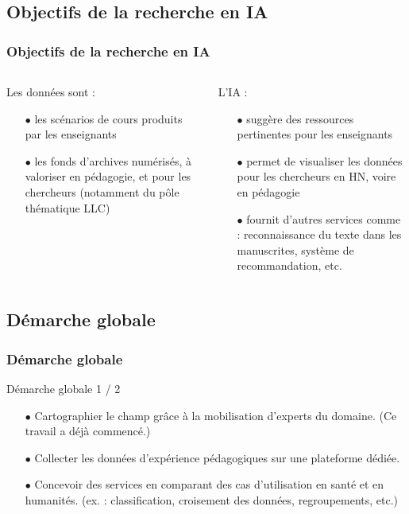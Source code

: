 \documentclass[xcolor=dvipsnames]{beamer}
\begin{document}
\subsection{Objectifs de la recherche en IA
}
\begin{frame}[fragile]
\frametitle{Objectifs de la recherche en IA
}
\begin{columns}
	\begin{block}{Les données sont :}
		\begin{itemize}
			\item[$\bullet$]les scénarios de cours produits par les enseignants
			\item[$\bullet$]les fonds d’archives numérisés, à valoriser en pédagogie, et pour les chercheurs (notamment du pôle thématique LLC)
		\end{itemize}	
	\end{block}
\vspace{4cm}
	\begin{block}{L'IA :}
		\begin{itemize}
		\item[$\bullet$]suggère des ressources pertinentes pour les enseignants
		\item[$\bullet$]permet de visualiser les données pour les chercheurs en HN, voire en pédagogie
		\item[$\bullet$]fournit d’autres services comme : reconnaissance du texte dans les manuscrites, système de recommandation, etc.
		\end{itemize}
	\end{block}
\vspace{2.5cm}
\end{columns}
\end{frame}

\subsection{Démarche globale}
\begin{frame}[fragile]
\frametitle{Démarche globale}
\begin{block}{Démarche globale 1 / 2}
	\begin{itemize}
		\item[$\bullet$]Cartographier le champ grâce à la mobilisation d’experts du domaine. (Ce travail a déjà commencé.)
		\item[$\bullet$]Collecter les données d’expérience pédagogiques sur une plateforme dédiée.
		\item[$\bullet$]Concevoir des services en comparant des cas d'utilisation en santé et en humanités. (ex. : classification, croisement des données, regroupements, etc.)
	\end{itemize}
\end{block}
\vspace{2cm}
\end{frame}
\end{document}

